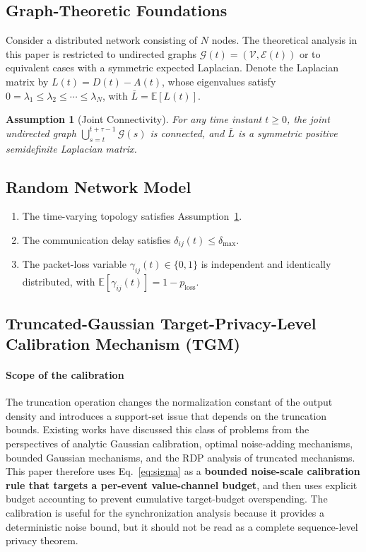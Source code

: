\documentclass[10pt]{article}
\newtheorem{assumption}{Assumption}[section]
\newcommand{\Lbar}{\bar{L}}
\newcommand{\ploss}{p_{\text{loss}}}
\begin{document}
\subsection{Graph-Theoretic Foundations}

Consider a distributed network consisting of $N$ nodes. The theoretical analysis in this paper is restricted to undirected graphs $\mathcal{G}(t)=(\mathcal{V},\mathcal{E}(t))$ or to equivalent cases with a symmetric expected Laplacian. Denote the Laplacian matrix by $L(t)=D(t)-A(t)$, whose eigenvalues satisfy $0=\lambda_1\leq\lambda_2\leq\cdots\leq\lambda_N$, with $\Lbar=\mathbb{E}[L(t)]$.

\begin{assumption}[Joint Connectivity]\label{ass:connect}
  For any time instant $t\geq0$, the joint undirected graph $\bigcup_{s=t}^{t+\tau-1}\mathcal{G}(s)$ is connected, and $\Lbar$ is a symmetric positive semidefinite Laplacian matrix.
\end{assumption}

\subsection{Random Network Model}

\begin{enumerate}
  \item The time-varying topology satisfies Assumption~\ref{ass:connect}.
  \item The communication delay satisfies $\delta_{ij}(t)\leq\delta_{\max}$.
  \item The packet-loss variable $\gamma_{ij}(t)\in\{0,1\}$ is independent and identically distributed, with $\mathbb{E}[\gamma_{ij}(t)]=1-\ploss$.
\end{enumerate}

\subsection{Truncated-Gaussian Target-Privacy-Level Calibration Mechanism (TGM)}

\paragraph{Scope of the calibration}
The truncation operation changes the normalization constant of the output density and introduces a support-set issue that depends on the truncation bounds. Existing works have discussed this class of problems from the perspectives of analytic Gaussian calibration\cite{balle2018}, optimal noise-adding mechanisms\cite{geng2016}, bounded Gaussian mechanisms\cite{chen2022bounded}, and the RDP analysis of truncated mechanisms\cite{fu2023truncated}. This paper therefore uses Eq.~\eqref{eq:sigma} as a \textbf{bounded noise-scale calibration rule that targets a per-event value-channel budget}, and then uses explicit budget accounting to prevent cumulative target-budget overspending. The calibration is useful for the synchronization analysis because it provides a deterministic noise bound, but it should not be read as a complete sequence-level privacy theorem.
\end{document}
